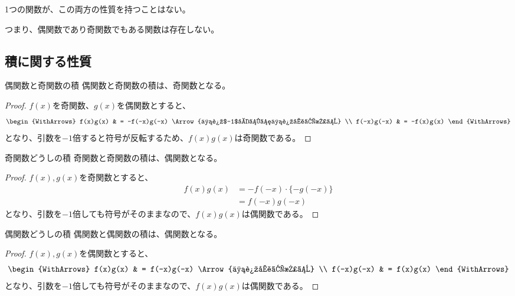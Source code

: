 \documentclass[16pt,b5paper]{book}
\begin{document}
1つの関数が、この両方の性質を持つことはない。

つまり、偶関数であり奇関数でもある関数は存在しない。

\subsection{積に関する性質}

\begin{theorem}{偶関数と奇関数の積}
  偶関数と奇関数の積は、奇関数となる。
\end{theorem}

\begin{proof}
  $f(x)$を奇関数、$g(x)$を偶関数とすると、
  \begin{equation}
    \begin{WithArrows}
      f(x)g(x)   & = -f(-x)g(-x) \Arrow{両辺$-1$倍して両辺入れ替え} \\
      f(-x)g(-x) & = -f(x)g(x)
    \end{WithArrows}
  \end{equation}
  となり、引数を$-1$倍すると符号が反転するため、$f(x)g(x)$は奇関数である。
\end{proof}

\begin{theorem}{奇関数どうしの積}
  奇関数と奇関数の積は、偶関数となる。
\end{theorem}

\begin{proof}
  $f(x), g(x)$を奇関数とすると、
  \begin{align}
    f(x)g(x) & = -f(-x)\cdot\{-g(-x)\} \\
             & = f(-x)g(-x)
  \end{align}
  となり、引数を$-1$倍しても符号がそのままなので、$f(x)g(x)$は偶関数である。
\end{proof}

\begin{theorem}{偶関数どうしの積}
  偶関数と偶関数の積は、偶関数となる。
\end{theorem}

\begin{proof}
  $f(x), g(x)$を偶関数とすると、
  \begin{equation}
    \begin{WithArrows}
      f(x)g(x)   & = f(-x)g(-x) \Arrow{両辺入れ替え} \\
      f(-x)g(-x) & = f(x)g(x)
    \end{WithArrows}
  \end{equation}
  となり、引数を$-1$倍しても符号がそのままなので、$f(x)g(x)$は偶関数である。
\end{proof}
\end{document}

